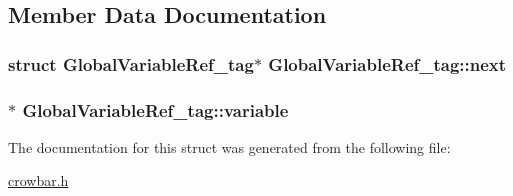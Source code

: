 \subsection{Member Data Documentation}
\hypertarget{struct_global_variable_ref__tag_aaadfe23f53ea5a6ed782d89a689cf47d}{}
\subsubsection[{next}]{\setlength{\rightskip}{0pt plus 5cm}struct {\bf Global\+Variable\+Ref\+\_\+tag}$\ast$ Global\+Variable\+Ref\+\_\+tag\+::next}\label{struct_global_variable_ref__tag_aaadfe23f53ea5a6ed782d89a689cf47d}
\hypertarget{struct_global_variable_ref__tag_aa1dd1472b8328df21455bffc4d2a4c12}{}
\subsubsection[{variable}]{$\ast$ Global\+Variable\+Ref\+\_\+tag\+::variable}\label{struct_global_variable_ref__tag_aa1dd1472b8328df21455bffc4d2a4c12}


The documentation for this struct was generated from the following file\+:\begin{DoxyCompactItemize}
\item 
\hyperlink{crowbar_8h}{crowbar.\+h}\end{DoxyCompactItemize}
